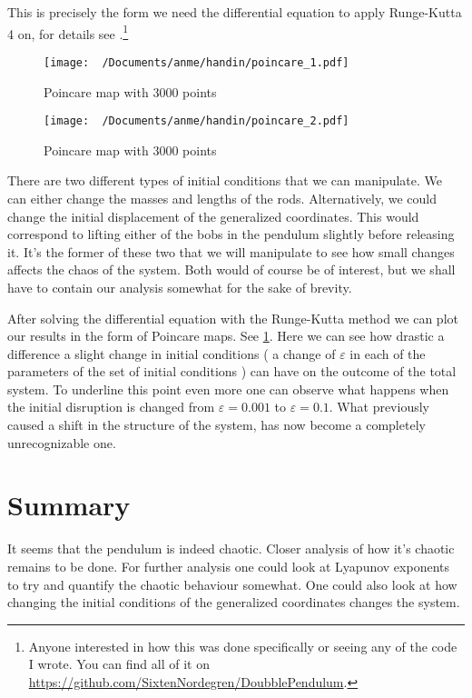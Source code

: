 \documentclass[twocolumn]{revtex4-2}
\begin{document}
This is precisely the form we need the differential equation to apply Runge-Kutta 4 on, for details see \cite{newman_2013}.\footnote{Anyone interested in how this was done specifically or seeing any of the code I wrote. You can find all of it on \url{https://github.com/SixtenNordegren/DoubblePendulum}.}

\begin{figure}[t]
	\texttt{[image: ~/Documents/anme/handin/poincare\_1.pdf]}
	\caption{Poincare map \label{fig: poincare 1} with $3000$ points}
\end{figure}
\begin{figure}[b]
	\texttt{[image: ~/Documents/anme/handin/poincare\_2.pdf]}
	\caption{Poincare map \label{fig: poincare 2} with $3000$ points}
\end{figure}
There are two different types of initial conditions that we can manipulate. We can either change the masses and lengths of the rods. Alternatively, we could change the initial displacement of the generalized coordinates. This would correspond to lifting either of the bobs in the pendulum slightly before releasing it. It's the former of these two that we will manipulate to see how small changes affects the chaos of the system. Both would of course be of interest, but we shall have to contain our analysis somewhat for the sake of brevity.
\par
After solving the differential equation with the Runge-Kutta\cite{newman_2013} method we can plot our results in the form of Poincare maps. See \ref{fig: poincare 1}. Here we can see how drastic a difference a slight change in initial conditions ( a change of $\varepsilon$ in each of the parameters of the set of initial conditions ) can have on the outcome of the total system. To underline this point even more one can observe what happens when the initial disruption is changed from $\varepsilon = 0.001 $ to $\varepsilon = 0.1$. What previously caused a shift in the structure of the system, has now become a completely unrecognizable one.

\section{Summary}
It seems that the pendulum is indeed chaotic. Closer analysis of how it's chaotic remains to be done. For further analysis one could look at Lyapunov exponents to try and quantify the chaotic behaviour somewhat. One could also look at how changing the initial conditions of the generalized coordinates changes the system.
\newpage
\appendix 
\end{document}
